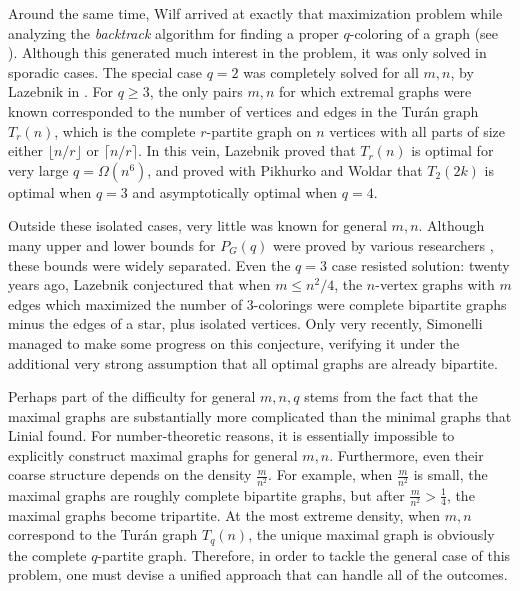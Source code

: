 \documentclass[11pt]{article}
\begin{document}
Around the same time, Wilf arrived at exactly that maximization
problem while analyzing the \emph{backtrack}\/ algorithm for finding a
proper $q$-coloring of a graph (see \cite{Bender-Wilf, Wilf}).
Although this generated much interest in the problem, it was only
solved in sporadic cases.  The special case $q=2$ was completely
solved for all $m,n$, by Lazebnik in \cite{Lazebnik-q23}.  For $q \geq
3$, the only pairs $m,n$ for which extremal graphs were known
corresponded to the number of vertices and edges in the Tur\'an graph
$T_r(n)$, which is the complete $r$-partite graph on $n$ vertices with
all parts of size either $\lfloor n/r \rfloor$ or $\lceil n/r \rceil$.
In this vein, Lazebnik \cite{Lazebnik-largeq} proved that $T_r(n)$ is
optimal for very large $q = \Omega(n^6)$, and proved with Pikhurko and Woldar
\cite{LPW} that $T_2(2k)$ is optimal when $q=3$ and asymptotically
optimal when $q=4$.

Outside these isolated cases, very little was known for general $m,n$.
Although many upper and lower bounds for $P_G(q)$ were proved by
various researchers \cite{Byer, Lazebnik-q23, Lazebnik-bounds, Liu},
these bounds were widely separated.  Even the $q=3$ case resisted
solution: twenty years ago, Lazebnik \cite{Lazebnik-q23} conjectured
that when $m \leq n^2/4$, the $n$-vertex graphs with $m$ edges which
maximized the number of 3-colorings were complete bipartite graphs
minus the edges of a star, plus isolated vertices.  Only very
recently, Simonelli \cite{Simonelli} managed to make some progress on
this conjecture, verifying it under the additional very strong
assumption that all optimal graphs are already bipartite.

Perhaps part of the difficulty for general $m,n,q$ stems from the fact
that the maximal graphs are substantially more complicated than the
minimal graphs that Linial found.  For number-theoretic reasons, it is
essentially impossible to explicitly construct maximal graphs for
general $m,n$.  Furthermore, even their coarse structure depends on
the density $\frac{m}{n^2}$.  For example, when $\frac{m}{n^2}$ is
small, the maximal graphs are roughly complete bipartite graphs, but
after $\frac{m}{n^2} > \frac{1}{4}$, the maximal graphs become
tripartite.  At the most extreme density, when $m,n$ correspond to the
Tur\'an graph $T_q(n)$, the unique maximal graph is obviously the
complete $q$-partite graph.  Therefore, in order to tackle the general
case of this problem, one must devise a unified approach that can
handle all of the outcomes.
\end{document}
